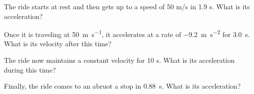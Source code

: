 \documentclass[10pt]{exam}
\begin{document}
\begin{questions}
  \question
    The ride starts at rest and then gets up to a speed of 50 m/s in 1.9 s.  What is its acceleration?
    \vs

  \question
    Once it is traveling at \SI{50}{\meter\per\second}, it accelerates at a rate of \SI{-9.2}{\meter\per\second^2} for \SI{3.0}{\second}.  What is its velocity after this time?
    \vs

  \question
    The ride now maintains a constant velocity for 10 s.  What is its acceleration during this time?
    \vs

  \question
    Finally, the ride comes to an abruot a stop in \SI{0.88}{\second}. What is its acceleration?
    \vs


 
\end{questions}
\end{document}
